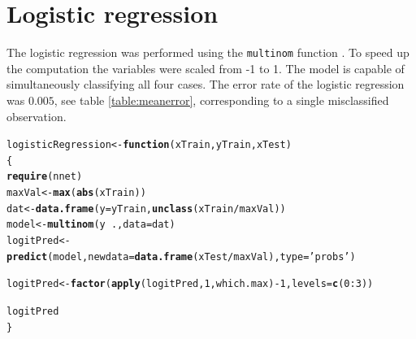 \documentclass[a4paper,draft=false]{scrreprt}\usepackage[]{graphicx}\usepackage[]{color}
\makeatletter
\newcommand{\hlnum}[1]{\textcolor[rgb]{0.686,0.059,0.569}{#1}}%
\newcommand{\hlstr}[1]{\textcolor[rgb]{0.192,0.494,0.8}{#1}}%
\newcommand{\hlopt}[1]{\textcolor[rgb]{0,0,0}{#1}}%
\newcommand{\hlstd}[1]{\textcolor[rgb]{0.345,0.345,0.345}{#1}}%
\newcommand{\hlkwa}[1]{\textcolor[rgb]{0.161,0.373,0.58}{\textbf{#1}}}%
\newcommand{\hlkwb}[1]{\textcolor[rgb]{0.69,0.353,0.396}{#1}}%
\newcommand{\hlkwc}[1]{\textcolor[rgb]{0.333,0.667,0.333}{#1}}%
\newcommand{\hlkwd}[1]{\textcolor[rgb]{0.737,0.353,0.396}{\textbf{#1}}}%
\newenvironment{kframe}{%
 \def\at@end@of@kframe{}%
 \ifinner\ifhmode%
  \def\at@end@of@kframe{\end{minipage}}%
  \begin{minipage}{\columnwidth}%
 \fi\fi%
 \def\FrameCommand##1{\hskip\@totalleftmargin \hskip-\fboxsep
 \colorbox{shadecolor}{##1}\hskip-\fboxsep
     \hskip-\linewidth \hskip-\@totalleftmargin \hskip\columnwidth}%
 \MakeFramed {\advance\hsize-\width
   \@totalleftmargin\z@ \linewidth\hsize
   \@setminipage}}%
 {\par\unskip\endMakeFramed%
 \at@end@of@kframe}
\newenvironment{knitrout}{}{} %
\makeatother
\begin{document}
\section{Logistic regression} %
The logistic regression was performed using the \verb+multinom+ function \cite{class_nnet}. To speed up the computation the variables were scaled from -1 to 1. The model is capable of simultaneously classifying all four cases. The error rate of the logistic regression was $0.005$, see table \ref{table:meanerror}, corresponding to a single misclassified observation.
\begin{knitrout}
\color{fgcolor}\begin{kframe}
\begin{alltt}
\hlstd{logisticRegression} \hlkwb{<-} \hlkwa{function}\hlstd{(}\hlkwc{xTrain}\hlstd{,} \hlkwc{yTrain}\hlstd{,} \hlkwc{xTest}\hlstd{)}
\hlstd{\{}
  \hlkwd{require}\hlstd{(nnet)}
  \hlstd{maxVal} \hlkwb{<-} \hlkwd{max}\hlstd{(}\hlkwd{abs}\hlstd{(xTrain))}
  \hlstd{dat} \hlkwb{<-} \hlkwd{data.frame}\hlstd{(}\hlkwc{y} \hlstd{= yTrain,} \hlkwd{unclass}\hlstd{(xTrain}\hlopt{/}\hlstd{maxVal))}
  \hlstd{model} \hlkwb{<-} \hlkwd{multinom}\hlstd{(y} \hlopt{~} \hlstd{.,} \hlkwc{data} \hlstd{= dat)}
  \hlstd{logitPred} \hlkwb{<-} \hlkwd{predict}\hlstd{(model,} \hlkwc{newdata}\hlstd{=} \hlkwd{data.frame}\hlstd{(xTest}\hlopt{/}\hlstd{maxVal),} \hlkwc{type}\hlstd{=}\hlstr{'probs'}\hlstd{)}

  \hlstd{logitPred} \hlkwb{<-} \hlkwd{factor}\hlstd{(}\hlkwd{apply}\hlstd{(logitPred,} \hlnum{1}\hlstd{, which.max)} \hlopt{-} \hlnum{1}\hlstd{,} \hlkwc{levels} \hlstd{=} \hlkwd{c}\hlstd{(}\hlnum{0}\hlopt{:}\hlnum{3}\hlstd{))}

  \hlstd{logitPred}
\hlstd{\}}
\end{alltt}
\end{kframe}
\end{knitrout}
\end{document}
